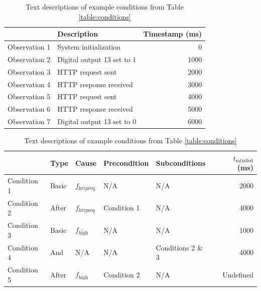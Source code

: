 \documentclass[12pt]{article}
\begin{document}
\begin{table}
\begin{center}
\caption{Example observations}
\label{table:observations}
\begin{tabular}{l|lr}
& Description & Timestamp (ms) \\ \hline
Observation 1 & System initialization & 0 \\
Observation 2 & Digital output 13 set to 1 & 1000 \\
Observation 3 & HTTP request sent & 2000 \\
Observation 4 & HTTP response received & 3000 \\
Observation 5 & HTTP request sent & 4000 \\
Observation 6 & HTTP response received & 5000 \\
Observation 7 & Digital output 13 set to 0 & 6000 \\ \hline
\end{tabular}

\vspace{5mm}

\caption{Example conditions, with $t_{\text{satisfied}}$ calculated with respect to Table \ref{table:observations}}
\label{table:conditions}

\vspace{3mm}

\begin{tabular}{l|llllr}
& Type & Cause & Precondition & Subconditions & $t_{\text{satisfied}}$ (ms) \\ \hline
Condition 1 & Basic & $f_{\text{httpreq}}$ & N/A & N/A & 2000 \\
Condition 2 & After & $f_{\text{httpreq}}$ & Condition 1 & N/A & 4000 \\
Condition 3 & Basic & $f_{\text{high}}$ & N/A & N/A & 1000 \\
Condition 4 & And & N/A & N/A & Conditions 2 \& 3 & 4000 \\
Condition 5 & After & $f_{\text{high}}$ & Condition 2 & N/A & Undefined \\ \hline
\end{tabular}

\vspace{5mm}

\caption{Text descriptions of example conditions from Table \ref{table:conditions}}
\label{table:condition-descs}

\vspace{3mm}


\end{center}
\end{table}
\end{document}
